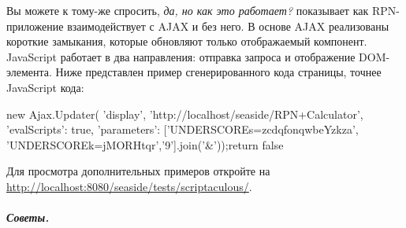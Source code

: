 \documentclass[a4paper,10pt,twoside]{book}
\begin{document}



Вы можете к тому-же спросить, \emph{да, но как это работает?}
 показывает как RPN-приложение взаимодействует с
AJAX и без него. В основе AJAX реализованы короткие замыкания, которые
обновляют только отображаемый компонент. JavaScript работает в два
направления: отправка запроса и отображение DOM-элемента. Ниже
представлен пример сгенерированного кода страницы, точнее JavaScript кода:

\begin{code}{}
new Ajax.Updater(
	'display',
	'http://localhost/seaside/RPN+Calculator',
	{'evalScripts': true,
'parameters': ['UNDERSCOREs=zcdqfonqwbeYzkza',
'UNDERSCOREk=jMORHtqr','9'].join('&')});return false
\end{code}


Для просмотра дополнительных примеров откройте на
\url{http://localhost:8080/seaside/tests/scriptaculous/}.

\paragraph{\emph{Советы.}}
\end{document}
